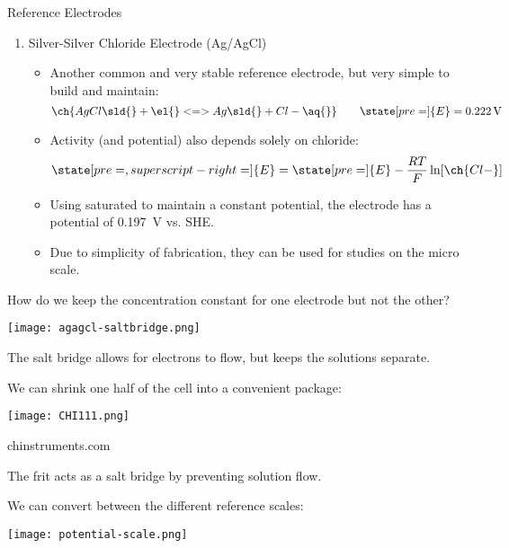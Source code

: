 \documentclass[notes=only]{beamer}
\begin{document}
\begin{frame}[allowframebreaks]{Reference Electrodes}
\begin{enumerate}
			\framebreak

		\item Silver-Silver Chloride Electrode (Ag/AgCl)

			\begin{itemize}
				\item Another common and very stable reference
					electrode, but very simple to build and
					maintain:
					\begin{equation*}
						\ch{AgCl\sld{} + \el{} <=>
						Ag\sld{} + Cl- \aq{}} \qquad
						\state[pre=]{E} =
						\SI{0.222}{\volt}
					\end{equation*}
				\item Activity (and potential) also depends
					solely on chloride:
					\begin{equation*}
						\state[pre=,superscript-right=]{E}
						= \state[pre=]{E} -
						\frac{RT}{F} \ln [\ch{Cl-}]
					\end{equation*}
				\item Using saturated  to maintain a
					constant potential, the electrode has a
					potential of \SI{0.197}{\volt} vs. SHE.
				\item Due to simplicity of fabrication, they can
					be used for studies on the micro scale.
			\end{itemize}
	\end{enumerate}

	\framebreak

	How do we keep the concentration constant for one electrode but not the
	other?

	\begin{center}
		\texttt{[image: agagcl-saltbridge.png]}
	\end{center}

	The \alert{salt bridge} allows for electrons to flow, but keeps the
	solutions separate.

	\framebreak

	We can shrink \alert{one half} of the cell into a convenient package:

	\begin{center}
		\texttt{[image: CHI111.png]}

		\footnotesize chinstruments.com
	\end{center}

	The frit acts as a salt bridge by preventing solution flow.

	\framebreak

	We can convert between the different reference scales:

	\begin{center}
		\texttt{[image: potential-scale.png]}
	\end{center}
\end{frame}
\end{document}

